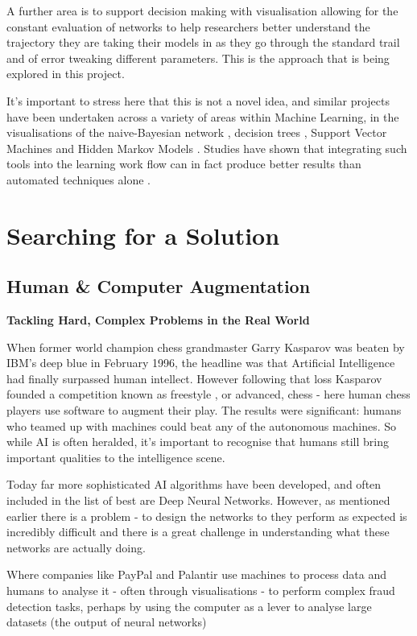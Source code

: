 \documentclass[a4paper,11pt,titlepage]{article}
\begin{document}
		A further area is to support decision making with visualisation allowing for the constant evaluation of networks to help researchers better understand the trajectory they are taking their models in as they go through the standard trail and of error tweaking different parameters. This is the approach that is being explored in this project. 
		\par
	It's important to stress here that this is not a novel idea, and similar projects have been undertaken across a variety of areas within Machine Learning, in the visualisations of the naive-Bayesian network \cite{Becker2001}, decision trees \cite{Ankerst1999}, Support Vector Machines \cite{Caragea2001} and Hidden Markov Models \cite{Dai2008}. Studies have shown that integrating such tools into the learning work flow can in fact produce better results than automated techniques alone \cite{Ware2002}.

\section{Searching for a Solution}
	\subsection{Human \& Computer Augmentation}

\textbf{Tackling Hard, Complex Problems in the Real World}

When former world champion chess grandmaster Garry Kasparov was beaten by IBM’s deep blue in February 1996, the headline was that Artificial Intelligence had finally surpassed human intellect. However following that loss Kasparov founded a competition known as freestyle , or advanced, chess - here human chess players use software to augment their play. The results were significant: humans who teamed up with machines could beat any of the autonomous machines. So while AI is often heralded, it's important to recognise that humans still bring important qualities to the intelligence scene. 

Today far more sophisticated AI algorithms have been developed, and often included in the list of best are Deep Neural Networks. However, as mentioned earlier there is a problem - to design the networks to they perform as expected is incredibly difficult and there is a great challenge in understanding what these networks are actually doing. 

Where companies like PayPal and Palantir use machines to process data and humans to analyse it - often through visualisations - to perform complex fraud detection tasks, perhaps by using the computer as a lever to analyse large datasets (the output of neural networks) 
\end{document}
